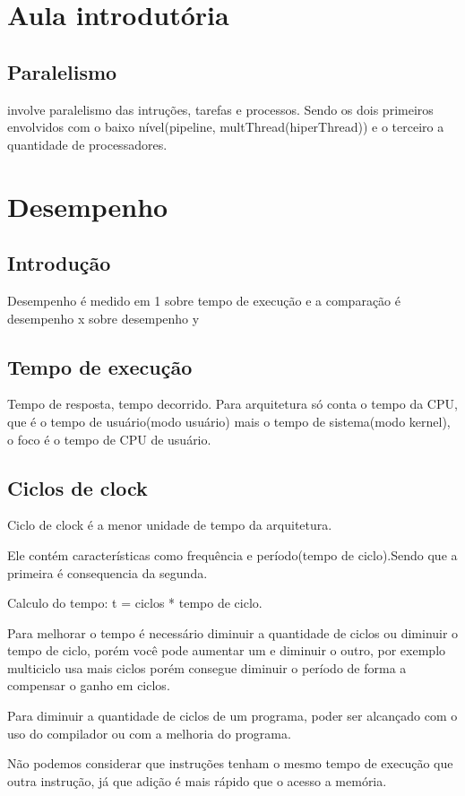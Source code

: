 \documentclass[a4paper]{article}
\begin{document}
\section{Aula introdutória}
\subsection{Paralelismo}
involve paralelismo das intruções, tarefas e processos.
Sendo os dois primeiros envolvidos com o baixo nível(pipeline, multThread(hiperThread)) e o terceiro a quantidade de processadores.
\section{Desempenho}
\subsection{Introdução}
    Desempenho é medido em 1 sobre tempo de execução e a comparação é desempenho x sobre desempenho y
\subsection{Tempo de execução}
Tempo de resposta, tempo decorrido. Para arquitetura só conta o tempo da CPU, que é o tempo de usuário(modo usuário)
mais o tempo de sistema(modo kernel), o foco é o tempo de CPU de usuário.

\subsection{Ciclos de clock}
Ciclo de clock é a menor unidade de tempo da arquitetura.

Ele contém características como frequência e período(tempo de ciclo).Sendo que a primeira é consequencia da segunda.

Calculo do tempo: t =  ciclos * tempo de ciclo.

Para melhorar o tempo é necessário diminuir a quantidade de ciclos ou diminuir o tempo de ciclo, porém você pode
aumentar um e diminuir o outro, por exemplo multiciclo usa mais ciclos porém consegue diminuir o período de forma a
compensar o ganho em ciclos.

Para diminuir a quantidade de ciclos de um programa, poder ser alcançado com o uso do compilador ou com a melhoria do
programa.

Não podemos considerar que instruções tenham o mesmo tempo de execução que outra instrução, já que adição é mais rápido
que o acesso a memória.
\end{document}

